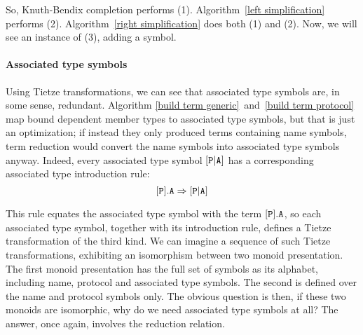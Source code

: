 \documentclass[../generics]{subfiles}
\begin{document}
So, Knuth-Bendix completion performs (1). Algorithm~\ref{left simplification} performs (2). Algorithm~\ref{right simplification} does both (1) and (2). Now, we will see an instance of (3), adding a symbol.

\paragraph{Associated type symbols} Using Tietze transformations, we can see that associated type symbols are, in some sense, redundant. Algorithm \ref{build term generic}~and~\ref{build term protocol} map bound dependent member types to associated type symbols, but that is just an optimization; if instead they only produced terms containing name symbols, term reduction would convert the name symbols into associated type symbols anyway. Indeed, every associated type symbol $[\texttt{P}|\texttt{A}]$ has a corresponding associated type introduction rule:
\[[\texttt{P}].\texttt{A}\Rightarrow[\texttt{P}|\texttt{A}]\]

This rule equates the associated type symbol with the term $[\texttt{P}].\texttt{A}$, so each associated type symbol, together with its introduction rule, defines a Tietze transformation of the third kind. We can imagine a sequence of such Tietze transformations, exhibiting an isomorphism between two monoid presentation. The first monoid presentation has the full set of symbols as its alphabet, including name, protocol and associated type symbols. The second is defined over the name and protocol symbols only. The obvious question is then, if these two monoids are isomorphic, why do we need associated type symbols at all? The answer, once again, involves the reduction relation.
\end{document}
